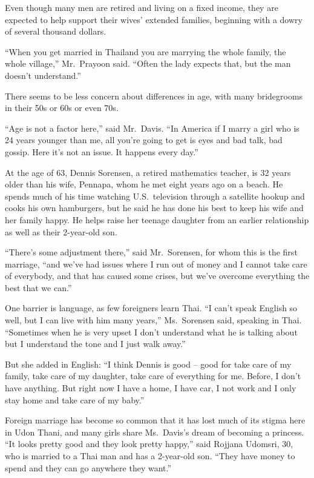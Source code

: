 ﻿\documentclass[12pt]{article}
\begin{document}
Even though many men are retired and living on a fixed income, they are expected to help support
their wives' extended families, beginning with a dowry of several thousand dollars.

``When you get married in Thailand you are marrying the whole family, the whole village,''
Mr.~Prayoon said. ``Often the lady expects that, but the man doesn't understand.''

There seems to be less concern about differences in age, with many bridegrooms in their 50s or 60s
or even 70s.

``Age is not a factor here,'' said Mr.~Davis. ``In America if I marry a girl who is 24 years younger
than me, all you're going to get is eyes and bad talk, bad gossip. Here it's not an issue. It
happens every day.''

At the age of 63, Dennis Sorensen, a retired mathematics teacher, is 32 years older than his wife,
Pennapa, whom he met eight years ago on a beach. He spends much of his time watching U.S.~television
through a satellite hookup and cooks his own hamburgers, but he said he has done his best to keep
his wife and her family happy. He helps raise her teenage daughter from an earlier relationship as
well as their 2-year-old son.

``There's some adjustment there,'' said Mr.~Sorensen, for whom this is the first marriage, ``and
we've had issues where I run out of money and I cannot take care of everybody, and that has caused
some crises, but we've overcome everything the best that we can.''

One barrier is language, as few foreigners learn Thai. ``I can't speak English so well, but I can
live with him many years,'' Ms.~Sorensen said, speaking in Thai. ``Sometimes when he is very upset I
don't understand what he is talking about but I understand the tone and I just walk away.''

But she added in English: ``I think Dennis is good -- good for take care of my family, take care of
my daughter, take care of everything for me. Before, I don't have anything. But right now I have a
home, I have car, I not work and I only stay home and take care of my baby.''

Foreign marriage has become so common that it has lost much of its stigma here in Udon Thani, and
many girls share Ms.~Davis's dream of becoming a princess. ``It looks pretty good and they look
pretty happy,'' said Rojjana Udomsri, 30, who is married to a Thai man and has a 2-year-old son.
``They have money to spend and they can go anywhere they want.''
\end{document}
